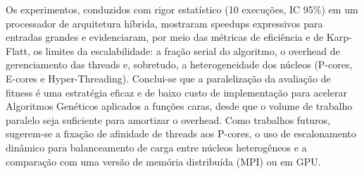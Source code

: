 \documentclass[12pt]{article}
\begin{document}
Os experimentos, conduzidos com rigor estatístico (10 execuções, IC 95\%) em
um processador de arquitetura híbrida, mostraram speedups expressivos para
entradas grandes e evidenciaram, por meio das métricas de eficiência e de
Karp-Flatt, os limites da escalabilidade: a fração serial do algoritmo, o
overhead de gerenciamento das threads e, sobretudo, a heterogeneidade dos
núcleos (P-cores, E-cores e Hyper-Threading). Conclui-se que a paralelização
da avaliação de fitness é uma estratégia eficaz e de baixo custo de
implementação para acelerar Algoritmos Genéticos aplicados a funções caras,
desde que o volume de trabalho paralelo seja suficiente para amortizar o
overhead. Como trabalhos futuros, sugerem-se a fixação de afinidade de threads
aos P-cores, o uso de escalonamento dinâmico para balanceamento de carga entre
núcleos heterogêneos e a comparação com uma versão de memória distribuída
(MPI) ou em GPU.



\end{document}

